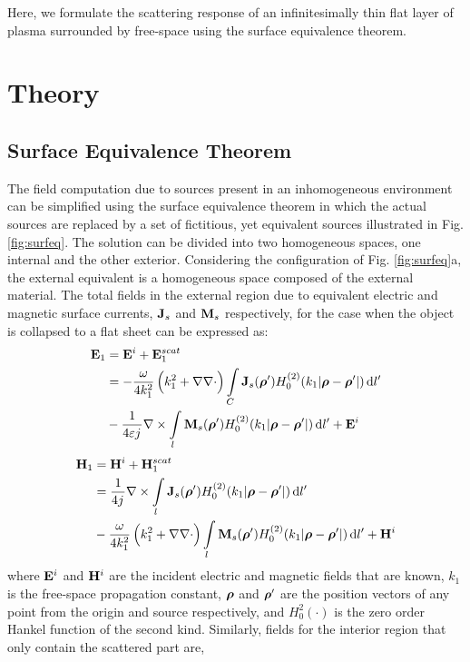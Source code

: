 Here, we formulate the scattering response of an infinitesimally thin flat layer of plasma surrounded by free-space using the surface equivalence theorem.


\section{Theory}
%
\subsection{Surface Equivalence Theorem}
%
The field computation due to sources present in an inhomogeneous environment can be simplified using the surface equivalence theorem in which the actual sources are replaced by a set of fictitious, yet equivalent sources illustrated in Fig. \ref{fig:surfeq}. The solution can be divided into two homogeneous spaces, one internal and the other exterior. Considering the configuration of Fig. \ref{fig:surfeq}a, the external equivalent is a homogeneous space composed of the external material. The total fields in the external region due to equivalent electric and magnetic surface currents, $\mathbf{J}_s$ and $\mathbf{M}_s$ respectively, for the case when the object is collapsed to a flat sheet can be expressed as:
%
\begin{equation}
  \begin{split}
    \mathbf{E}_1 &= \mathbf{E}^i + \mathbf{E}_1^{scat} \\
    &=  -\frac{\omega}{4 k_1^2} \left( k_1^2 + \nabla \nabla \cdot \right) \int\limits_{C} \mathbf{J}_s(\boldsymbol {\rho}') H_0^{(2)}(k_1 |\boldsymbol {\rho} - \boldsymbol {\rho}'|) \mathop{}\!\mathrm{d}{l'} \\
    &- \frac{1}{4 \varepsilon {j}\mkern1mu} \nabla \times \int\limits_{l} \mathbf{M}_s(\boldsymbol {\rho}') H_0^{(2)}(k_1 |\boldsymbol {\rho} - \boldsymbol {\rho}'|) \mathop{}\!\mathrm{d}{l'} + \mathbf{E}^i
  \end{split}
  \label{eq:E1sc}
\end{equation}
%
\begin{equation}
  \begin{split}
    \mathbf{H}_1 &= \mathbf{H}^i + \mathbf{H}_1^{scat} \\
    &= \frac{1}{4 {j}\mkern1mu} \nabla \times \int\limits_{l} \mathbf{J}_s(\boldsymbol {\rho}') H_0^{(2)}(k_1 |\boldsymbol {\rho} - \boldsymbol {\rho}'|) \mathop{}\!\mathrm{d}{l'} \\
    &-\frac{\omega}{4 k_1^2} \left( k_1^2 + \nabla \nabla \cdot \right) \int\limits_{l} \mathbf{M}_s(\boldsymbol {\rho}') H_0^{(2)}(k_1 |\boldsymbol {\rho} - \boldsymbol {\rho}'|) \mathop{}\!\mathrm{d}{l'} + \mathbf{H}^i
  \end{split}
  \label{eq:H1sc}
\end{equation}
%
where $\mathbf{E}^i$ and $\mathbf{H}^i$ are the incident electric and magnetic fields that are known, $k_1$ is the free-space propagation constant, $\boldsymbol {\rho}$ and $\boldsymbol {\rho}'$ are the position vectors of any point from the origin and source respectively, and $H_0^2(\cdot)$ is the zero order Hankel function of the second kind.  Similarly, fields for the interior region that only contain the scattered part are,
